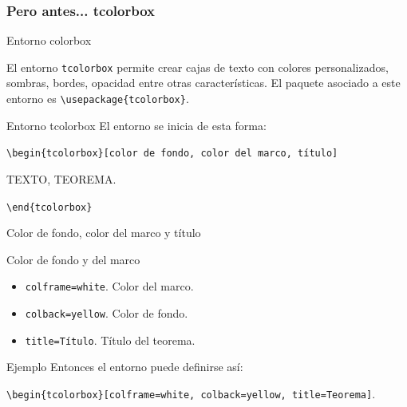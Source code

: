 \documentclass[aspectratio=169, 10pt]{beamer}
\begin{document}
\subsubsection{Pero antes... tcolorbox}

\begin{frame}[fragile]{Entorno colorbox}

El entorno \verb|tcolorbox| permite crear cajas de texto con colores personalizados, sombras, bordes, opacidad entre otras características. El paquete asociado a este entorno es \verb|\usepackage{tcolorbox}|.

\begin{alertblock}{Entorno tcolorbox}
    El entorno se inicia de esta forma:
    
    \vspace{5mm}
    \verb|\begin{tcolorbox}[color de fondo, color del marco, título]|
    \vspace{5mm}

    \hspace{5mm} TEXTO, TEOREMA.

    \vspace{5mm}

    \verb|\end{tcolorbox}|
    
\end{alertblock}
\end{frame}


\begin{frame}[fragile]{Color de fondo, color del marco y título}


\begin{block}{Color de fondo y del marco}

    \begin{itemize}
        \item \verb|colframe=white|. Color del marco.
        \item \verb|colback=yellow|. Color de fondo.
        \item \verb|title=Título|. Título del teorema.
    \end{itemize}
    
\end{block}


\begin{alertblock}{Ejemplo}
    Entonces el entorno puede definirse así:


    \hspace{5mm} \verb|\begin{tcolorbox}[colframe=white, colback=yellow, title=Teorema]|.
\end{alertblock}

\end{frame}
\end{document}

